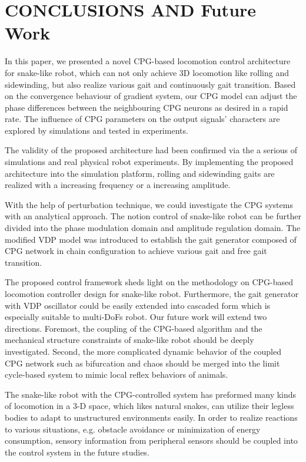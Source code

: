 \documentclass[letterpaper, 10 pt, conference]{ieeeconf}
\begin{document}
\section{CONCLUSIONS AND Future Work}

In this paper, we presented a novel CPG-based locomotion control architecture for snake-like robot, which can not only achieve 3D locomotion like rolling and sidewinding, but also realize various gait and continuously gait transition.
Based on the convergence behaviour of gradient system, our CPG model can adjust the phase differences between the neighbouring CPG neurons as desired in a rapid rate. The influence of CPG parameters on the output signals' characters are explored by simulations and tested in experiments.  


The validity of the proposed architecture had been confirmed via the a serious of simulations and real physical robot experiments.
By implementing the proposed architecture into the simulation platform, rolling and sidewinding gaits are realized with a increasing frequency or a increasing amplitude.  

With the help of perturbation technique, we could investigate the CPG systems with an analytical approach. The notion control of snake-like robot can be further divided into the phase modulation domain and amplitude regulation domain. The modified VDP model was introduced to establish the gait generator composed of CPG network in chain configuration to achieve various gait and free gait transition.

The proposed control framework sheds light on the methodology on CPG-based locomotion controller design for snake-like robot. Furthermore, the gait generator with VDP oscillator could be easily extended into cascaded form which is especially suitable to multi-DoFs robot. Our future work will extend two directions. Foremost, the coupling of the CPG-based algorithm and the mechanical structure constraints of snake-like robot should be deeply investigated. Second, the more complicated dynamic behavior of the coupled CPG network such as bifurcation and chaos should be merged into the limit cycle-based system to mimic local reflex behaviors of animals.

The snake-like robot with the CPG-controlled system has preformed many kinds of locomotion in a 3-D space, which likes natural snakes, can utilize their legless bodies to adapt to unstructured environments easily. In order to realize reactions to various situations, e.g. obstacle avoidance or minimization of energy consumption, sensory information from peripheral sensors should be coupled into the control system in the future studies.




\end{document}

